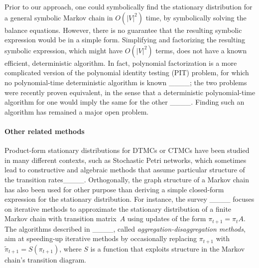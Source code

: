 Prior to our approach, one could symbolically find the stationary distribution for a general symbolic Markov chain in $O(|V|^2)$ time, by symbolically solving the balance equations. However, there is no guarantee that the resulting symbolic expression would be in a simple form.
Simplifying and factorizing the resulting symbolic expression, which might have $O(|V|^2)$ terms,
does not have a known efficient, deterministic algorithm.
In fact, polynomial factorization is a more complicated version of the polynomial identity testing (PIT) problem,
for which no polynomial-time deterministic algorithm is known ____;
the two problems were recently proven equivalent, in the sense that a deterministic polynomial-time algorithm for one would imply the same for the other ____.
Finding such an algorithm has remained a major open problem.



\paragraph*{Other related methods}

Product-form stationary distributions
for DTMCs or CTMCs
have been studied in many different contexts,
such as Stochastic Petri networks,
which sometimes lead to constructive and algebraic methods
that assume particular structure of the transition rates____.
Orthogonally, the graph structure of a Markov chain
has also been used for other purpose
than deriving a simple closed-form expression
for the stationary distribution.
For instance, the survey ____ focuses on iterative methods
to approximate the stationary distribution of a finite
Markov chain with transition matrix~$A$
using updates of the form $\pi_{t+1} = \pi_t A$.
The algorithms described in ____,
called \textit{aggregation-disaggregation methods},
aim at speeding-up iterative methods
by occasionally replacing $\pi_{t+1}$ with $\tilde\pi_{t+1} = S(\pi_{t+1})$,
where $S$ is a function that exploits
structure in the Markov chain's transition diagram.